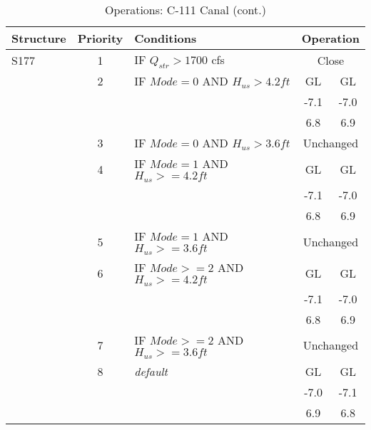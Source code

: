 \clearpage

\scriptsize
\begin{table}[!h]
\centering
\caption{Operations: C-111 Canal (cont.)}
\label{tab:M11opsC111b}
\begin{tabular}{|l|c|l|c|c|}
\hline
\textbf{Structure} & \textbf{Priority}  & \textbf{Conditions} & \multicolumn{2}{|c|}{\textbf{Operation}}   \\
\hline
\hline
S177          &  1  & IF $Q_{str}>1700$ cfs                  & \multicolumn{2}{|c|}{Close}   \\
\hline
              &  2  & IF $Mode=0$  AND $H_{us}>4.2ft$       & GL    & GL   \\
              &     &                                        & -7.1  & -7.0 \\
              &     &                                        & 6.8   & 6.9  \\
\hline
              &  3  & IF $Mode=0$ AND $H_{us}>3.6ft$        & \multicolumn{2}{|c|}{Unchanged}   \\
\hline
              &  4  & IF $Mode=1$  AND $H_{us}>=4.2ft$       & GL    & GL   \\
              &     &                                        & -7.1  & -7.0 \\
              &     &                                        & 6.8   & 6.9  \\
\hline
              &  5  & IF $Mode=1$ AND $H_{us}>=3.6ft$        & \multicolumn{2}{|c|}{Unchanged}   \\
\hline
              &  6  & IF $Mode>=2$ AND $H_{us}>=4.2ft$       & GL    & GL   \\
              &     &                                        & -7.1  & -7.0 \\
              &     &                                        & 6.8   & 6.9  \\
\hline
              &  7  & IF $Mode>=2$ AND $H_{us}>=3.6ft$       & \multicolumn{2}{|c|}{Unchanged}   \\
\hline
              &  8  & \it{default}                           & GL    & GL    \\
              &     &                                        & -7.0  & -7.1 \\
              &     &                                        & 6.9   & 6.8  \\
\hline
\hline



\end{tabular}
\end{table}
